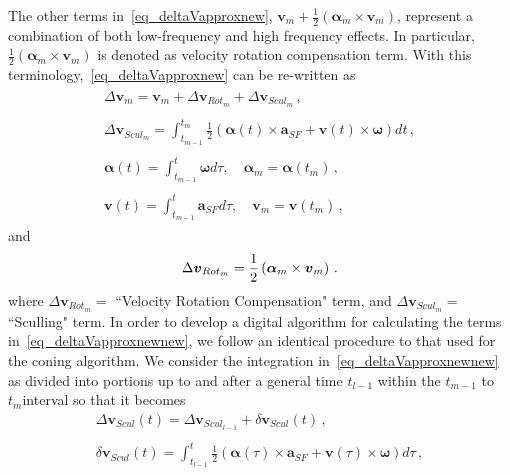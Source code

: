 \documentclass[journal]{IEEEtran}
\begin{document}
The other terms in~\eqref{eq_deltaVapproxnew}, $\boldsymbol{v}_m+\frac{1}{2}\left(\boldsymbol{\alpha}_m \times \boldsymbol{v}_m \right)$, represent a combination of both low-frequency and  high frequency effects. In particular, $\frac{1}{2}\left(\boldsymbol{\alpha}_m \times \boldsymbol{v}_m \right)$ is denoted as  velocity rotation compensation term. With this terminology,~\eqref{eq_deltaVapproxnew} can be re-written as 
\begin{equation}\label{eq_deltaVapproxnewnew}
 \begin{split}
 \begin{array}{c}
\Delta\boldsymbol{v}_m = \boldsymbol{v}_m+ \Delta\boldsymbol{v}_{Rot_{m}} + \Delta\boldsymbol{v}_{Scul_{m}}\,,\\
\\
\Delta\boldsymbol{v}_{Scul_{m}}=\int_{t_{m-1}}^{t_m}\frac{1}{2}  \left(\boldsymbol{\alpha}(t)\times \boldsymbol{a}_{SF} +\boldsymbol{v}(t)\times \boldsymbol{\omega}\right)dt\,,\\
\\
\boldsymbol{\alpha}(t) = \int_{t_{m-1}}^{t}\boldsymbol{\omega}d\tau, \quad\boldsymbol{\alpha}_m =  \boldsymbol{\alpha}(t_m)\,,\\
\\
\boldsymbol{v}(t)=\int_{t_{m-1}}^{t}{\boldsymbol{a}_{SF}d\tau}, \quad \boldsymbol{v}_m =  \boldsymbol{v}(t_m)\,,
\end{array}
\end{split}
\end{equation}
and
\begin{equation}\label{deltaVapproxnewnnn}
\Delta\boldsymbol{v}_{Rot_{m}} =\frac{1}{2}\left(\boldsymbol{\alpha}_m \times \boldsymbol{v}_m \right)\,.\\
\end{equation}
where $\Delta\boldsymbol{v}_{Rot_{m}}=$ ``Velocity Rotation Compensation" term, and 
$\Delta\boldsymbol{v}_{Scul_{m}}= $ ``Sculling" term.
 In order to develop a digital algorithm for calculating the terms in~\eqref{eq_deltaVapproxnewnew}, we follow an identical procedure to that used for the coning algorithm. We consider the integration in~\eqref{eq_deltaVapproxnewnew} as divided into portions up to and after a general time $t_{l-1}$ within the $t_{m-1}$ to $t_{m}$interval so that it becomes
\begin{equation}\label{eq_digitalscul}
\begin{array}{c}
\Delta\boldsymbol{v}_{Scul}(t) =\Delta\boldsymbol{v}_{Scul_{l-1}} +\delta\boldsymbol{v}_{Scul}(t)\,,\\
\\
\delta\boldsymbol{v}_{Scul}(t) = \int_{t_{l-1}}^{t}\frac{1}{2}  \left(\boldsymbol{\alpha}(\tau)\times \boldsymbol{a}_{SF} +\boldsymbol{v}(\tau)\times \boldsymbol{\omega}\right)d\tau\,,
\end{array}
\end{equation}
\end{document}
